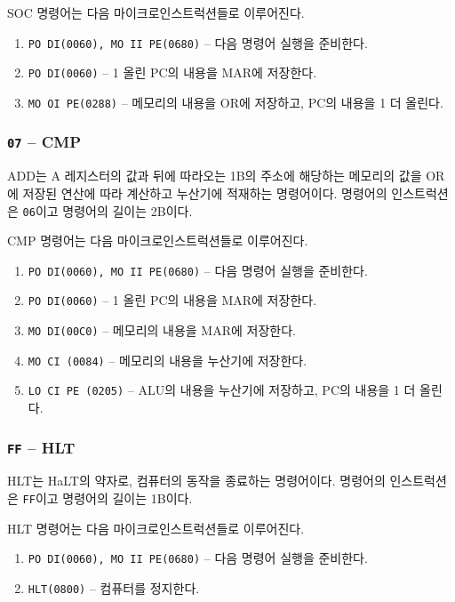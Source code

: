 \documentclass{article}
\begin{document}
SOC 명령어는 다음 마이크로인스트럭션들로 이루어진다.

\begin{enumerate}
    \item \texttt{PO DI(0060), MO II PE(0680)} -- 다음 명령어 실행을 준비한다.
    \setcounter{enumi}{2}
    \item \texttt{PO DI(0060)} -- 1 올린 PC의 내용을 MAR에 저장한다.
    \item \texttt{MO OI PE(0288)} -- 메모리의 내용을 OR에 저장하고,
        PC의 내용을 1 더 올린다.
\end{enumerate}

\subsubsection{\texttt{07} -- CMP}

ADD는 A 레지스터의 값과 뒤에 따라오는 1B의 주소에 해당하는 메모리의 값을
OR에 저장된 연산에 따라 계산하고 누산기에 적재하는 명령어이다.
명령어의 인스트럭션은 \texttt{06}이고 명령어의 길이는 2B이다.

CMP 명령어는 다음 마이크로인스트럭션들로 이루어진다.

\begin{enumerate}
    \item \texttt{PO DI(0060), MO II PE(0680)} -- 다음 명령어 실행을 준비한다.
    \setcounter{enumi}{2}
    \item \texttt{PO DI(0060)} -- 1 올린 PC의 내용을 MAR에 저장한다.
    \item \texttt{MO DI(00C0)} -- 메모리의 내용을 MAR에 저장한다.
    \item \texttt{MO CI (0084)} -- 메모리의 내용을 누산기에 저장한다.
    \item \texttt{LO CI PE (0205)} -- ALU의 내용을 누산기에 저장하고,
        PC의 내용을 1 더 올린다.
\end{enumerate}

\subsubsection{\texttt{FF} -- HLT}

HLT는 HaLT의 약자로, 컴퓨터의 동작을 종료하는 명령어이다.
명령어의 인스트럭션은 \texttt{FF}이고 명령어의 길이는 1B이다.

HLT 명령어는 다음 마이크로인스트럭션들로 이루어진다.

\begin{enumerate}
    \item \texttt{PO DI(0060), MO II PE(0680)} -- 다음 명령어 실행을 준비한다.
    \setcounter{enumi}{2}
    \item \texttt{HLT(0800)} -- 컴퓨터를 정지한다.
\end{enumerate}
\end{document}
